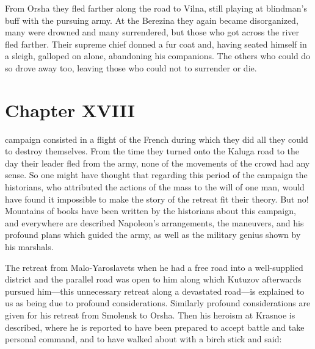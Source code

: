 From Orsha they fled farther along the road to Vilna, still
playing at blindman's buff with the pursuing army. At the
Berezina they again became disorganized, many were drowned and
many surrendered, but those who got across the river fled
farther. Their supreme chief donned a fur coat and, having seated
himself in a sleigh, galloped on alone, abandoning his
companions. The others who could do so drove away too, leaving
those who could not to surrender or die.


\chapter*{Chapter XVIII} \ifaudio {}
\fi

 campaign consisted in a flight of the French during which
they did all they could to destroy themselves. From the time they
turned onto the Kaluga road to the day their leader fled from the
army, none of the movements of the crowd had any sense. So one
might have thought that regarding this period of the campaign the
historians, who attributed the actions of the mass to the will of
one man, would have found it impossible to make the story of the
retreat fit their theory. But no!  Mountains of books have been
written by the historians about this campaign, and everywhere are
described Napoleon's arrangements, the maneuvers, and his
profound plans which guided the army, as well as the military
genius shown by his marshals.

The retreat from Malo-Yaroslavets when he had a free road into a
well-supplied district and the parallel road was open to him
along which Kutuzov afterwards pursued him---this unnecessary
retreat along a devastated road---is explained to us as being due
to profound considerations. Similarly profound considerations are
given for his retreat from Smolensk to Orsha. Then his heroism at
Krasnoe is described, where he is reported to have been prepared
to accept battle and take personal command, and to have walked
about with a birch stick and said:

